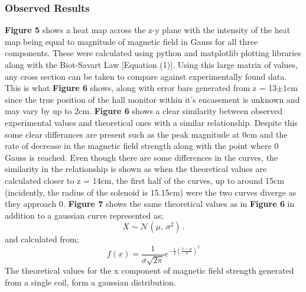 \documentclass{article}
\begin{document}
   \subsubsection{Observed Results}
   \textbf{Figure 5} shows a heat map across the z-y plane with the intensity of the heat map being equal to magnitude of magnetic field in Gauss for all three components. These were calculated 
   using python and matplotlib plotting libraries along with the Biot-Savart Law [Equation (1)].
   \newline Using this large matrix of values, any cross section can be taken to compare against experimentally found data.
   \newline This is what \textbf{Figure 6} shows, along with error bars generated from z = 13\(\pm\)1cm since the true position of the hall monitor within 
   it's encasement is unknown and may vary by up to 2cm.
   \newline
   \newline
   \textbf{Figure 6} shows a clear similarity between observed experimental values and theoretical ones with a similar relationship. Despite this some clear differances are present
   such as the peak magnitude at 0cm and the rate of decrease in the magnetic field strength along with the point where 0 Gauss is reached. Even though there are some differences in the curves, 
   the similarity in the relationship is shown as when the theoretical values are calculated closer to z = 14cm, the first half of the curves, up to around 15cm (incidently, the radius of the solenoid is 15.15cm)
   were the two curves diverge as they approach 0.
   \newline
   \newline
   \textbf{Figure 7} shows the same theoretical values as in \textbf{Figure 6} in addition to a gaussian curve represented as;
   \begin{equation}
    X \sim \mathcal{N}(\mu,\,\sigma^{2})\,.
   \end{equation}
   and calculated from;
   \begin{equation}
    {\displaystyle f(x)={\frac {1}{\sigma {\sqrt {2\pi }}}}e^{-{\frac {1}{2}}\left({\frac {x-\mu }{\sigma }}\right)^{2}}}
   \end{equation}
   The theoretical values for the x component of magnetic field strength generated from a single coil, form a gaussian distribution.
\end{document}
